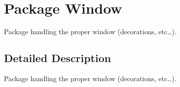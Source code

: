 \hypertarget{namespace_window}{\section{Package Window}
\label{namespace_window}
}


Package handling the proper window (decorations, etc…).  




\subsection{Detailed Description}
Package handling the proper window (decorations, etc…). 